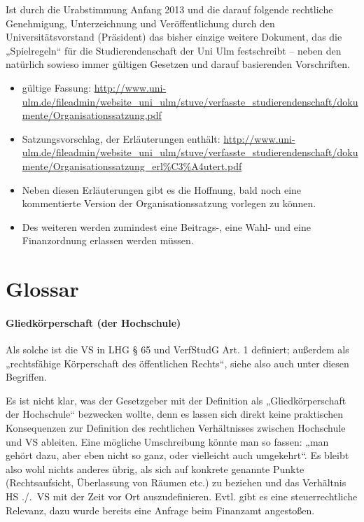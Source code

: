 \documentclass[
10pt,
a4paper,
twoside,								%
titlepage=false,							%
draft=false								%
]{scrartcl}
\begin{document}
Ist durch die Urabstimmung Anfang 2013 und die darauf folgende rechtliche Genehmigung, Unterzeichnung und Veröffentlichung durch den Universitätsvorstand (Präsident) das bisher einzige weitere Dokument, das die „Spielregeln“ für die Studierendenschaft der Uni Ulm festschreibt – neben den natürlich sowieso immer gültigen Gesetzen und darauf basierenden Vorschriften.

\begin{itemize}
	\item gültige Fassung: \sloppy  \url{http://www.uni-ulm.de/fileadmin/website_uni_ulm/stuve/verfasste_studierendenschaft/dokumente/Organisationssatzung.pdf}
	\item Satzungsvorschlag, der Erläuterungen enthält: \url{http://www.uni-ulm.de/fileadmin/website_uni_ulm/stuve/verfasste_studierendenschaft/dokumente/Organisationssatzung_erl%C3%A4utert.pdf}
	\item Neben diesen Erläuterungen gibt es die Hoffnung, bald noch eine kommentierte Version der Organisationssatzung vorlegen zu können.
	\item Des weiteren werden zumindest eine Beitrags-, eine  Wahl- und eine Finanzordnung erlassen werden müssen.
\end{itemize}


\newpage
\section{Glossar}
\label{sec:Glossar}


\paragraph{Gliedkörperschaft (der Hochschule)}

Als solche ist die VS in LHG § 65 und VerfStudG Art. 1 definiert; außerdem als „rechtsfähige Körperschaft des öffentlichen Rechts“, siehe also auch unter diesen Begriffen.

Es ist nicht klar, was der Gesetzgeber mit der Definition als „Gliedkörperschaft der Hochschule“ bezwecken wollte, denn es lassen sich direkt keine praktischen Konsequenzen zur Definition des rechtlichen Verhältnisses zwischen Hochschule und VS ableiten. Eine mögliche Umschreibung könnte man so fassen: „man gehört dazu, aber eben nicht so ganz, oder vielleicht auch umgekehrt“. Es bleibt also wohl nichts anderes übrig, als sich auf konkrete genannte Punkte (Rechtsaufsicht, Überlassung von Räumen etc.) zu beziehen und das Verhältnis HS ./.~VS mit der Zeit vor Ort auszudefinieren. Evtl. gibt es eine steuerrechtliche Relevanz, dazu wurde bereits eine Anfrage beim Finanzamt angestoßen.
\end{document}
